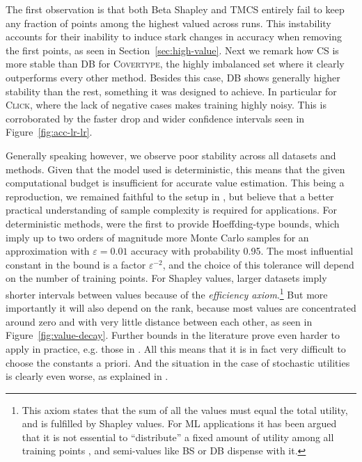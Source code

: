 \documentclass[10pt]{article}
\newcommand{\tmem}[1]{{\em #1\/}}
\newcommand{\tmname}[1]{\textsc{#1}}
\begin{document}
The first observation is that both Beta Shapley and TMCS entirely fail to keep
any fraction of points among the highest valued across runs. This instability
accounts for their inability to induce stark changes in accuracy when removing
the first points, as seen in  Section~\ref{sec:high-value}. Next we remark how
CS is more stable than DB for {\tmname{Covertype}}, the highly imbalanced set
where it clearly outperforms every other method. Besides this case, DB shows
generally higher stability than the rest, something it was designed to
achieve. In particular for {\tmname{Click}}, where the lack of negative cases
makes training highly noisy. This is corroborated by the faster drop and wider
confidence intervals seen in  Figure~\ref{fig:acc-lr-lr}.

Generally speaking however, we observe poor stability across all datasets and
methods. Given that the model used is deterministic, this means that the given
computational budget is insufficient for accurate value estimation. This being
a reproduction, we remained faithful to the setup in
{\cite{schoch_csshapley_2022}}, but believe that a better practical
understanding of sample complexity is required for applications. For
deterministic methods, {\cite{maleki_bounding_2014}} were the first to
provide Hoeffding-type bounds, which imply up to two orders of magnitude more
Monte Carlo samples for an approximation with $\varepsilon = 0.01$ accuracy
with probability 0.95. The most influential constant in the bound is a factor
$\varepsilon^{- 2}$, and the choice of this tolerance will depend on the
number of training points. For Shapley values, larger datasets imply shorter
intervals between values because of the {\tmem{efficiency
axiom}}.\footnote{This axiom states that the sum of all the values must equal
the total utility, and is fulfilled by Shapley values. For ML applications it
has been argued that it is not essential to ``distribute'' a fixed amount of
utility among all training points {\cite{kwon_beta_2022}}, and semi-values
like BS or DB dispense with it.} But more importantly it will also depend on
the rank, because most values are concentrated around zero and with very
little distance between each other, as seen in  Figure~\ref{fig:value-decay}.
Further bounds in the literature prove even harder to apply in practice, e.g.
those in {\cite{watson_accelerated_2023}}. All this means that it is in fact
very difficult to choose the constants a priori. And the situation in the case
of stochastic utilities is clearly even worse, as explained in
{\cite{wang_data_2023}}.
\end{document}
